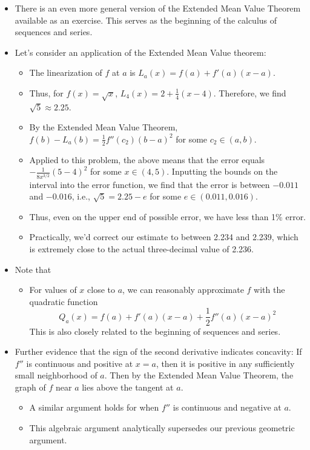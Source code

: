 \documentclass[../main.tex]{subfiles}
\begin{document}
\begin{itemize}
\begin{thm}
\begin{proof}
        \end{proof}
    \end{thm}
    \item There is an even more general version of the Extended Mean Value Theorem available as an exercise. This serves as the beginning of the calculus of sequences and series.
    \item Let's consider an application of the Extended Mean Value theorem: 
    \begin{itemize}
        \item The linearization of $f$ at $a$ is $L_a(x)=f(a)+f'(a)(x-a)$.
        \item Thus, for $f(x)=\sqrt{x}$, $L_4(x)=2+\frac{1}{4}(x-4)$. Therefore, we find $\sqrt{5}\approx 2.25$.
        \item By the Extended Mean Value Theorem, $f(b)-L_a(b)=\frac{1}{2}f''(c_2)(b-a)^2$ for some $c_2\in(a,b)$.
        \item Applied to this problem, the above means that the error equals $-\frac{1}{8x^{3/2}}(5-4)^2$ for some $x\in(4,5)$. Inputting the bounds on the interval into the error function, we find that the error is between $-0.011$ and $-0.016$, i.e., $\sqrt{5}=2.25-e$ for some $e\in(0.011,0.016)$.
        \item Thus, even on the upper end of possible error, we have less than 1\% error.
        \item Practically, we'd correct our estimate to between 2.234 and 2.239, which is extremely close to the actual three-decimal value of 2.236.
    \end{itemize}
    \item Note that 
    \begin{itemize}
        \item For values of $x$ close to $a$, we can reasonably approximate $f$ with the quadratic function
        \begin{equation*}
            Q_a(x) = f(a)+f'(a)(x-a)+\frac{1}{2}f''(a)(x-a)^2
        \end{equation*}
        This is also closely related to the beginning of sequences and series.
    \end{itemize}
    \item Further evidence that the sign of the second derivative indicates concavity: If $f''$ is continuous and positive at $x=a$, then it is positive in any sufficiently small neighborhood of $a$. Then by the Extended Mean Value Theorem, the graph of $f$ near $a$ lies above the tangent at $a$.
    \begin{itemize}
        \item A similar argument holds for when $f''$ is continuous and negative at $a$.
        \item This algebraic argument analytically supersedes our previous geometric argument.
    \end{itemize}
\end{itemize}
\end{document}

